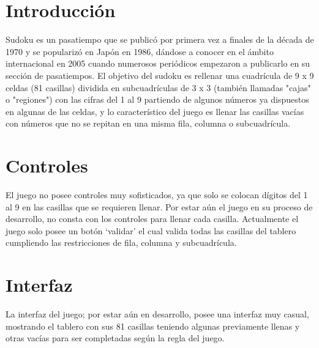 \documentclass[12pt]{article}
\begin{document}
\section{Introducción}

Sudoku es un pasatiempo que se publicó por primera vez a finales de la década de 1970 y se popularizó en Japón en 1986, dándose a conocer en el ámbito internacional en 2005 cuando numerosos periódicos empezaron a publicarlo en su sección de pasatiempos. El objetivo del sudoku es rellenar una cuadrícula de 9 x 9 celdas (81 casillas) dividida en subcuadrículas de 3 x 3 (también llamadas "cajas" o "regiones") con las cifras del 1 al 9 partiendo de algunos números ya dispuestos en algunas de las celdas, y lo característico del juego es llenar las casillas vacías con números que no se  repitan en una misma fila, columna o subcuadrícula. 
	

\section{Controles\\}

El juego no posee controles muy sofisticados, ya que solo se colocan dígitos del 1 al 9 en las casillas que se requieren llenar.
Por estar aún el juego en su proceso de desarrollo, no consta con los controles para llenar cada casilla.
Actualmente el juego solo posee un botón ‘validar’ el cual valida todas las casillas del tablero cumpliendo las restricciones de fila, columna y subcuadrícula.


\section{Interfaz}
La interfaz del juego; por estar aún en desarrollo, posee una interfaz muy casual, mostrando el tablero con sus  81 casillas teniendo algunas previamente llenas y otras vacías para ser completadas según la regla del juego.
\end{document}
